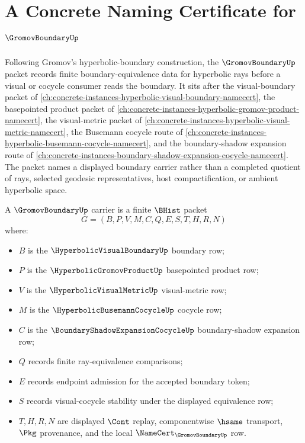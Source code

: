 \chapter{A Concrete Naming Certificate for $\GromovBoundaryUp$}
\label{ch:concrete-instances-gromov-boundary-namecert}

Following Gromov's hyperbolic-boundary construction, the $\GromovBoundaryUp$ packet records finite boundary-equivalence data for hyperbolic rays before a visual or cocycle consumer reads the boundary. It sits after the visual-boundary packet of \autoref{ch:concrete-instances-hyperbolic-visual-boundary-namecert}, the basepointed product packet of \autoref{ch:concrete-instances-hyperbolic-gromov-product-namecert}, the visual-metric packet of \autoref{ch:concrete-instances-hyperbolic-visual-metric-namecert}, the Busemann cocycle route of \autoref{ch:concrete-instances-hyperbolic-busemann-cocycle-namecert}, and the boundary-shadow expansion route of \autoref{ch:concrete-instances-boundary-shadow-expansion-cocycle-namecert}. The packet names a displayed boundary carrier rather than a completed quotient of rays, selected geodesic representatives, host compactification, or ambient hyperbolic space.

\begin{definition}\label{def:gromov-boundary-carrier}
A $\GromovBoundaryUp$ carrier is a finite $\BHist$ packet
$$
G=(B,P,V,M,C,Q,E,S,T,H,R,N)
$$
where:
\begin{itemize}
\item $B$ is the $\HyperbolicVisualBoundaryUp$ boundary row;
\item $P$ is the $\HyperbolicGromovProductUp$ basepointed product row;
\item $V$ is the $\HyperbolicVisualMetricUp$ visual-metric row;
\item $M$ is the $\HyperbolicBusemannCocycleUp$ cocycle row;
\item $C$ is the $\BoundaryShadowExpansionCocycleUp$ boundary-shadow expansion row;
\item $Q$ records finite ray-equivalence comparisons;
\item $E$ records endpoint admission for the accepted boundary token;
\item $S$ records visual-cocycle stability under the displayed equivalence row;
\item $T,H,R,N$ are displayed $\Cont$ replay, componentwise $\hsame$ transport, $\Pkg$ provenance, and the local $\NameCert_{\GromovBoundaryUp}$ row.
\end{itemize}
\end{definition}

